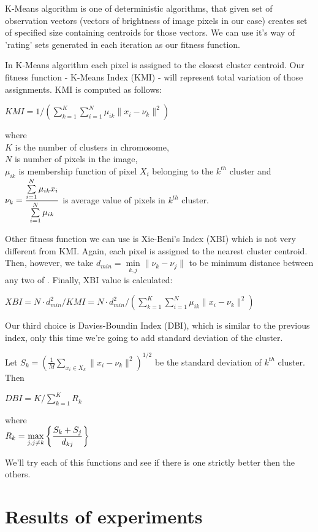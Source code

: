 \documentclass[11pt,leqno]{article}
\theoremstyle{mytheoremstyle}
\theoremstyle{mytheoremstyle}
\begin{document}
K-Means algorithm is one of deterministic algorithms, that given set of observation vectors (vectors of brightness of image pixels in our case) creates set of specified size containing centroids for those vectors. We can use it's way of 'rating' sets generated in each iteration as our fitness function.

In K-Means algorithm each pixel is assigned to the closest cluster centroid. Our fitness function - K-Means Index (KMI) - will represent total variation of those assignments. KMI is computed as follows:

\begin{center}
$KMI = 1/\left( \sum\limits_{k=1}^K \sum\limits_{i=1}^N \mu_{ik} \parallel x_i - \nu_k \parallel^2 \right)$
\end{center}

\noindent where \\ $K$ is the number of clusters in chromosome, \\ $N$ is number of pixels in the image, \\ $\mu_{ik}$ is membership function of pixel $X_i$ belonging to the $k^{th}$ cluster and \\ $\nu_k = \mathlarger{\frac{\sum\limits_{i=1}^N \mu_{ik} x_i}{\sum\limits_{i=1}^N \mu_{ik}}}$ is average value of pixels in $k^{th}$ cluster.

\vspace{0.5cm}

Other fitness function we can use is Xie-Beni's Index (XBI) which is not very different from KMI. Again, each pixel is assigned to the nearest cluster centroid. Then, however, we take $d_{min} = \min\limits_{k,j} \parallel \nu_k - \nu_j \parallel$ to be minimum distance between any two of . Finally, XBI value is calculated:

\begin{center}
$XBI = N \cdot d_{min}^2 / KMI = N \cdot d_{min}^2 / \left( \sum\limits_{k=1}^K \sum\limits_{i=1}^N \mu_{ik} \parallel x_i - \nu_k \parallel^2 \right)$
\end{center}

Our third choice is Davies-Boundin Index (DBI), which is similar to the previous index, only this time we're going to add standard deviation of the cluster.

Let $S_k = \left( \frac{1}{M} \sum\limits_{x_i \in X_k} \parallel x_i - \nu_k \parallel^2 \right)^{1/2}$ be the standard deviation of $k^{th}$ cluster. Then

\begin{center}
$DBI = K / \sum\limits_{k = 1}^K R_k$

where \\ $R_k = \max\limits_{j, j\neq k} \mathlarger{\left\lbrace \frac{S_k + S_j}{d_{kj}} \right\rbrace}$
\end{center}
We'll try each of this functions and see if there is one strictly better then the others.

\section{Results of experiments}
\end{document}
